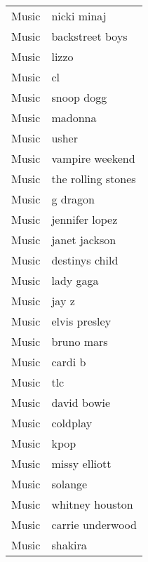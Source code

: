 \begin{supertabular}{l p{0.25\textwidth}}
            Music &                        nicki minaj \\
            Music &                    backstreet boys \\
            Music &                              lizzo \\
            Music &                                 cl \\
            Music &                         snoop dogg \\
            Music &                            madonna \\
            Music &                              usher \\
            Music &                    vampire weekend \\
            Music &                 the rolling stones \\
            Music &                           g dragon \\
            Music &                     jennifer lopez \\
            Music &                      janet jackson \\
            Music &                     destinys child \\
            Music &                          lady gaga \\
            Music &                              jay z \\
            Music &                      elvis presley \\
            Music &                         bruno mars \\
            Music &                            cardi b \\
            Music &                                tlc \\
            Music &                        david bowie \\
            Music &                           coldplay \\
            Music &                               kpop \\
            Music &                      missy elliott \\
            Music &                            solange \\
            Music &                    whitney houston \\
            Music &                   carrie underwood \\
            Music &                            shakira \\

\end{supertabular}
